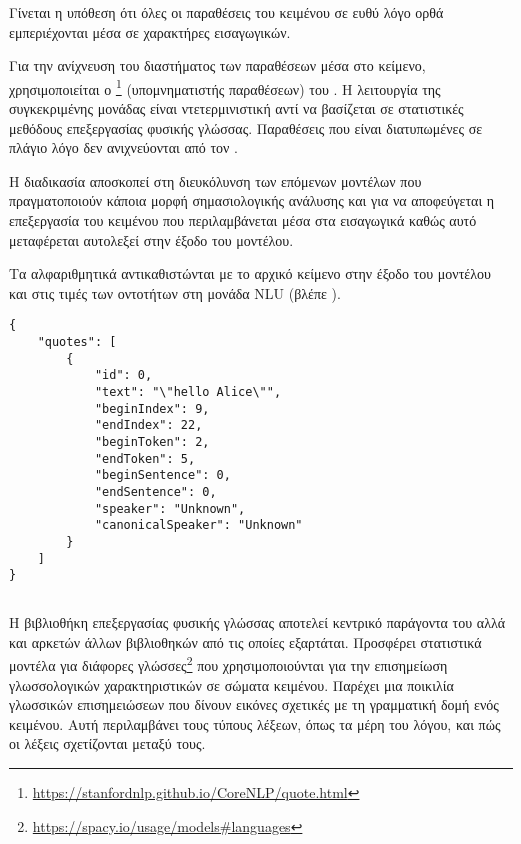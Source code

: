 Γίνεται η υπόθεση ότι όλες οι παραθέσεις του κειμένου σε ευθύ λόγο ορθά εμπεριέχονται μέσα σε χαρακτήρες εισαγωγικών.

Για την ανίχνευση του διαστήματος των παραθέσεων μέσα στο κείμενο, χρησιμοποιείται ο \footnote{\url{https://stanfordnlp.github.io/CoreNLP/quote.html}} (υπομνηματιστής παραθέσεων) του .
Η λειτουργία της συγκεκριμένης μονάδας είναι ντετερμινιστική αντί να βασίζεται σε στατιστικές μεθόδους επεξεργασίας φυσικής γλώσσας.
Παραθέσεις που είναι διατυπωμένες σε πλάγιο λόγο δεν ανιχνεύονται από τον .

Η διαδικασία αποσκοπεί στη διευκόλυνση των επόμενων μοντέλων που πραγματοποιούν κάποια μορφή σημασιολογικής ανάλυσης
και για να αποφεύγεται η επεξεργασία του κειμένου που περιλαμβάνεται μέσα στα εισαγωγικά καθώς αυτό μεταφέρεται αυτολεξεί στην έξοδο του μοντέλου.

Τα αλφαριθμητικά \QUOTESTRING{} αντικαθιστώνται με το αρχικό κείμενο στην έξοδο του μοντέλου και στις τιμές των οντοτήτων στη μονάδα NLU (βλέπε ).

\begin{code}
    \begin{verbatim}
{
    "quotes": [
        {
            "id": 0,
            "text": "\"hello Alice\"",
            "beginIndex": 9,
            "endIndex": 22,
            "beginToken": 2,
            "endToken": 5,
            "beginSentence": 0,
            "endSentence": 0,
            "speaker": "Unknown",
            "canonicalSpeaker": "Unknown"
        }
    ]
}
    \end{verbatim}
\end{code}

\subsection{}\label{subsec:4-spacy}
Η βιβλιοθήκη επεξεργασίας φυσικής γλώσσας  αποτελεί κεντρικό παράγοντα του \projectname{} αλλά και αρκετών άλλων βιβλιοθηκών από τις οποίες εξαρτάται.
Προσφέρει στατιστικά μοντέλα για διάφορες γλώσσες\footnote{\url{https://spacy.io/usage/models\#languages}} που χρησιμοποιούνται για την επισημείωση γλωσσολογικών χαρακτηριστικών σε σώματα κειμένου.
Παρέχει μια ποικιλία γλωσσικών επισημειώσεων που δίνουν εικόνες σχετικές με τη γραμματική δομή ενός κειμένου.
Αυτή περιλαμβάνει τους τύπους λέξεων, όπως τα μέρη του λόγου, και πώς οι λέξεις σχετίζονται μεταξύ τους.

